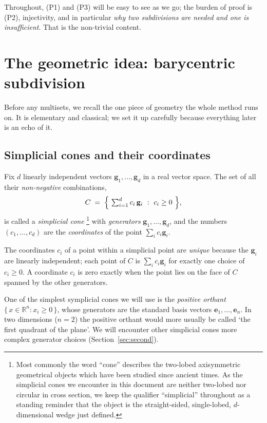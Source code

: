 \documentclass[11pt,a4paper]{article}
\theoremstyle{definition}
\theoremstyle{plain}
\newcommand{\R}{\mathbb{R}}
\newcommand{\bvec}[1]{\mathbf{#1}}
\begin{document}
\noindent
Throughout, (P1) and (P3) will be easy to see as we go; the burden of proof is
(P2), injectivity, and in particular \emph{why two subdivisions are needed and
one is insufficient}. That is the non-trivial content.

\section{The geometric idea: barycentric subdivision}
\label{sec:bary}

Before any multisets, we recall the one piece of geometry the whole method runs
on. It is elementary and classical; we set it up carefully because everything
later is an echo of it.

\subsection{Simplicial cones and their coordinates}
\label{sec:simplicialcone}

Fix $d$ linearly independent vectors $\bvec g_1,\dots,\bvec g_d$ in a real
vector space. The set of all their \emph{non-negative} combinations,
\begin{align}\label{eq:simplicialconedefined}
   C \;=\; \Bigl\{\ \textstyle\sum_{i=1}^d c_i\,\bvec g_i\ :\ c_i\ge 0\ \Bigr\},
\end{align}
is called a \emph{simplicial cone}%
\footnote{Most commonly the word ``cone'' describes the two-lobed axisymmetric geometrical objects which have been studied since ancient times. As the simplicial cones we encounter in this document are neither two-lobed nor circular in cross section, we keep the qualifier ``simplicial'' throughout as a standing reminder that the object is the straight-sided, single-lobed, $d$-dimensional wedge just defined.}
with \emph{generators} $\bvec g_1,\dots,
\bvec g_d$, and the numbers $(c_1,\dots,c_d)$ are the \emph{coordinates} of the
point $\sum_i c_i\bvec g_i$.


The coordinates $c_i$ of a point within a simplicial point are \emph{unique} because the $\bvec
g_i$ are linearly independent; each point of $C$ is $\sum_i c_i\bvec g_i$ for
exactly one choice of $c_i\ge0$. A coordinate $c_i$ is zero exactly when the
point lies on the face of $C$ spanned by the other generators.


One of the simplest symplicial cones we will use is the \emph{positive orthant}
$\{\,x\in\R^n:x_i\ge0\,\}$, whose generators are the standard basis vectors
$\bvec e_1,\dots,\bvec e_n$.  In two dimensions ($n=2$) the positive orthant would more usually be called `the first quadrant of the plane'.  We will encounter other simplicial cones more complex generator choices (Section~\ref{sec:second}).
\end{document}
